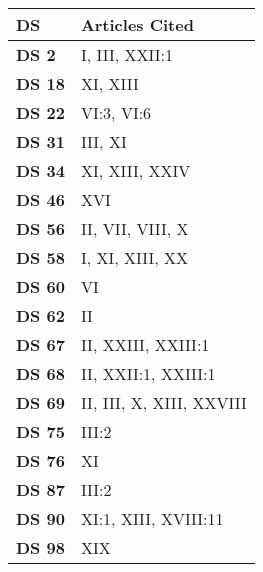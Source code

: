 
\begin{xltabular}{\linewidth}{ l | X }

    \hline

    \textbf{\normalsize DS} & \textbf{\normalsize Articles Cited}  \\
    \endfirsthead
    \hline \hline

    \textbf {DS 2} & I, III, XXII:1 \\ \hline

    \textbf {DS 18} & XI, XIII \\ \hline

    \textbf {DS 22} & VI:3, VI:6 \\ \hline

    \textbf {DS 31} & III, XI \\ \hline

    \textbf {DS 34} & XI, XIII, XXIV \\ \hline

    \textbf {DS 46} & XVI \\ \hline

    \textbf {DS 56} & II, VII, VIII, X \\ \hline

    \textbf {DS 58} & I, XI, XIII, XX \\ \hline

    \textbf {DS 60} & VI \\ \hline

    \textbf {DS 62} & II \\ \hline

    \textbf {DS 67} & II, XXIII, XXIII:1 \\ \hline

    \textbf {DS 68} & II, XXII:1, XXIII:1 \\ \hline

    \textbf {DS 69} & II, III, X, XIII, XXVIII \\ \hline

    \textbf {DS 75} & III:2 \\ \hline

    \textbf {DS 76} & XI \\ \hline

    \textbf {DS 87} & III:2 \\ \hline

    \textbf {DS 90} & XI:1, XIII, XVIII:11 \\ \hline

    \textbf {DS 98} & XIX \\ \hline


\end{xltabular}
